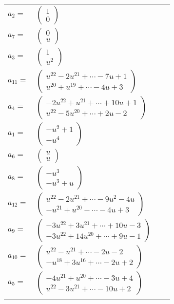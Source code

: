 \documentclass[1p]{elsarticle_modified}
\theoremstyle{definition}
\begin{document}
\begin{tabular}{m{7pt} m{180pt} m{7pt} m{180pt} }
\flushright $a_{2}=$&$\begin{pmatrix}1\\0\end{pmatrix}$ \\
\flushright $a_{7}=$&$\begin{pmatrix}0\\u\end{pmatrix}$ \\
\flushright $a_{3}=$&$\begin{pmatrix}1\\u^2\end{pmatrix}$ \\
\flushright $a_{11}=$&$\begin{pmatrix}u^{22}-2 u^{21}+\cdots-7 u+1\\u^{20}+u^{19}+\cdots-4 u+3\end{pmatrix}$ \\
\flushright $a_{4}=$&$\begin{pmatrix}-2 u^{22}+u^{21}+\cdots+10 u+1\\u^{22}-5 u^{20}+\cdots+2 u-2\end{pmatrix}$ \\
\flushright $a_{1}=$&$\begin{pmatrix}- u^2+1\\- u^4\end{pmatrix}$ \\
\flushright $a_{6}=$&$\begin{pmatrix}u\\u\end{pmatrix}$ \\
\flushright $a_{8}=$&$\begin{pmatrix}- u^3\\- u^3+u\end{pmatrix}$ \\
\flushright $a_{12}=$&$\begin{pmatrix}u^{22}-2 u^{21}+\cdots-9 u^2-4 u\\- u^{21}+u^{20}+\cdots-4 u+3\end{pmatrix}$ \\
\flushright $a_{9}=$&$\begin{pmatrix}-3 u^{22}+3 u^{21}+\cdots+10 u-3\\-3 u^{22}+14 u^{20}+\cdots+9 u-1\end{pmatrix}$ \\
\flushright $a_{10}=$&$\begin{pmatrix}u^{22}- u^{21}+\cdots-2 u-2\\- u^{18}+3 u^{16}+\cdots-2 u+2\end{pmatrix}$ \\
\flushright $a_{5}=$&$\begin{pmatrix}-4 u^{21}+u^{20}+\cdots-3 u+4\\u^{22}-3 u^{21}+\cdots-10 u+2\end{pmatrix}$\\&\end{tabular}
\end{document}

